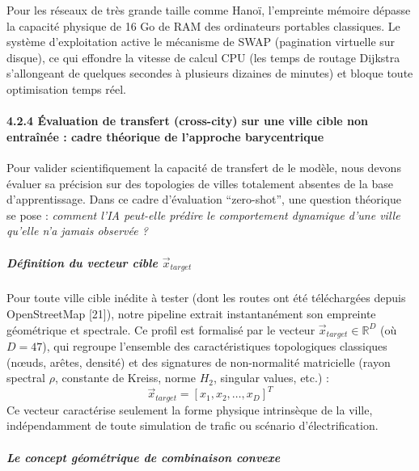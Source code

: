 \documentclass[10pt, a4paper]{article}
\begin{document}
Pour les réseaux de très grande taille comme Hanoï, l'empreinte mémoire
dépasse la capacité physique de 16 Go de RAM des ordinateurs portables
classiques. Le système d'exploitation active le mécanisme de SWAP
(pagination virtuelle sur disque), ce qui effondre la vitesse de calcul
CPU (les temps de routage Dijkstra s'allongeant de quelques secondes à
plusieurs dizaines de minutes) et bloque toute optimisation temps réel.

\paragraph{4.2.4 Évaluation de transfert (cross-city) sur une ville
cible non entraînée : cadre théorique de l'approche
barycentrique}\label{uxe9valuation-de-transfert-cross-city-sur-une-ville-cible-non-entrauxeenuxe9e-cadre-thuxe9orique-de-lapproche-barycentrique}

Pour valider scientifiquement la capacité de transfert de le modèle,
nous devons évaluer sa précision sur des topologies de villes totalement
absentes de la base d'apprentissage. Dans ce cadre d'évaluation
``zero-shot'', une question théorique se pose : \emph{comment l'IA
peut-elle prédire le comportement dynamique d'une ville qu'elle n'a
jamais observée ?}

\subparagraph{\texorpdfstring{Définition du vecteur cible
\(\vec{x}_{target}\)}{Définition du vecteur cible \textbackslash vec\{x\}\_\{target\}}}\label{duxe9finition-du-vecteur-cible-vecx_target}

Pour toute ville cible inédite à tester (dont les routes ont été
téléchargées depuis OpenStreetMap {[}21{]}), notre pipeline extrait
instantanément son empreinte géométrique et spectrale. Ce profil est
formalisé par le vecteur \(\vec{x}_{target} \in \mathbb{R}^D\) (où
\(D = 47\)), qui regroupe l'ensemble des caractéristiques topologiques
classiques (nœuds, arêtes, densité) et des signatures de non-normalité
matricielle (rayon spectral \(\rho\), constante de Kreiss, norme
\(H_2\), singular values, etc.) :
\[\vec{x}_{target} = [x_1, x_2, \dots, x_D]^T\] Ce vecteur caractérise
seulement la forme physique intrinsèque de la ville, indépendamment de
toute simulation de trafic ou scénario d'électrification.

\subparagraph{Le concept géométrique de combinaison
convexe}\label{le-concept-guxe9omuxe9trique-de-combinaison-convexe}
\end{document}

